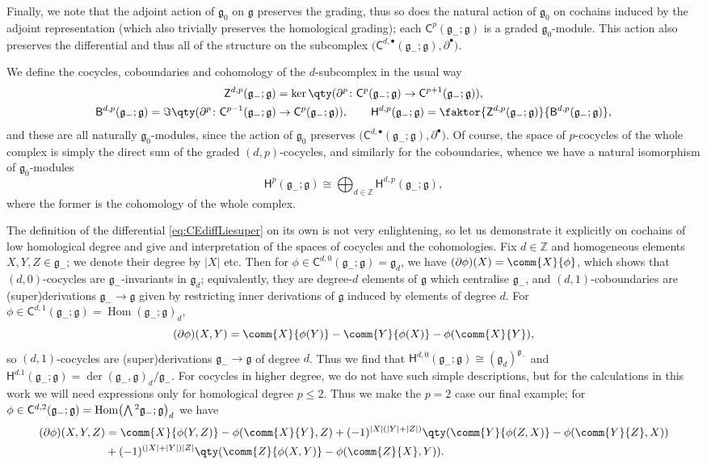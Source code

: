 \documentclass[10pt,a4paper]{amsart}
\numberwithin{equation}{section}
\newcommand{\fg}{\mathfrak{g}}
\newcommand{\ZZ}{\mathbb{Z}}
\newcommand{\ssB}{\mathsf{B}}
\newcommand{\ssC}{\mathsf{C}}
\newcommand{\ssH}{\mathsf{H}}
\newcommand{\ssZ}{\mathsf{Z}}
\newcommand{\Wedge}{\mathchoice{{\textstyle\bigwedge}}{\bigwedge}{\bigwedge}{\bigwedge}}	%
\newcommand{\1}{\mathbbm{1}}
\DeclareMathOperator{\Hom}{Hom}
\begin{document}
Finally, we note that the adjoint action of $\fg_0$ on $\fg$ preserves the grading, thus so does the natural action of $\fg_0$ on cochains induced by the adjoint representation (which also trivially preserves the homological grading); each $\ssC^p(\fg_-;\fg)$ is a graded $\fg_0$-module. This action also preserves the differential and thus all of the structure on the subcomplex $\bigl(\ssC^{d,\bullet}(\fg_-;\fg),\partial^\bullet\bigr)$.


We define the cocycles, coboundaries and cohomology of the $d$-subcomplex in the usual way
\begin{gather*}
	\ssZ^{d,p}(\fg_-;\fg) = \ker\qty(\partial^p\colon \ssC^p(\fg_-;\fg)\to \ssC^{p+1}(\fg_-;\fg)),	\\
	\ssB^{d,p}(\fg_-;\fg) = \Im\qty(\partial^p\colon \ssC^{p-1}(\fg_-;\fg)\to \ssC^{p}(\fg_-;\fg)),	\qquad
	\ssH^{d,p}(\fg_-;\fg) = \faktor{\ssZ^{d,p}(\fg_-;\fg)}{\ssB^{d,p}(\fg_-;\fg)},
\end{gather*}
and these are all naturally $\fg_0$-modules, since the action of $\fg_0$ preserves $\bigl(\ssC^{d,\bullet}(\fg_-;\fg),\partial^\bullet\bigr)$. Of course, the space of $p$-cocycles of the whole complex is simply the direct sum of the graded $(d,p)$-cocycles, and similarly for the coboundaries, whence we have a natural isomorphism of $\fg_0$-modules
\[
	\ssH^p(\fg_-;\fg) \cong \bigoplus_{d\in\ZZ}\ssH^{d,p}(\fg_-;\fg),
\]
where the former is the cohomology of the whole complex.

The definition of the differential \eqref{eq:CEdiffLiesuper} on its own is not very enlightening, so let us demonstrate it explicitly on cochains of low homological degree and give and interpretation of the spaces of cocycles and the cohomologies. Fix $d\in\ZZ$ and homogeneous elements $X,Y,Z\in\fg_-$; we denote their degree by $|X|$ etc. Then for $\phi\in\ssC^{d,0}(\fg_-;\fg)=\fg_d$, we have
$(\partial \phi)(X) = \comm{X}{\phi}$,
which shows that $(d,0)$-cocycles are $\fg_-$-invariants in $\fg_d$; equivalently, they are degree-$d$ elements of $\fg$ which centralise $\fg_-$, and $(d,1)$-coboundaries are (super)derivations $\fg_-\to\fg$ given by restricting inner derivations of $\fg$ induced by elements of degree $d$. For $\phi\in\ssC^{d,1}(\fg_-;\fg)=\Hom(\fg_-;\fg)_d$,
\[
	(\partial \phi)(X,Y) = \comm{X}{\phi(Y)} - \comm{Y}{\phi(X)} -\phi(\comm{X}{Y}),
\]
so $(d,1)$-cocycles are (super)derivations $\fg_-\to\fg$ of degree $d$. Thus we find that $\ssH^{d,0}(\fg_-;\fg) \cong (\fg_d)^{\fg_-}$ and $\ssH^{d.1}(\fg_-;\fg)=\operatorname{der}(\fg_-,\fg)_d/\fg_-$. For cocycles in higher degree, we do not have such simple descriptions, but for the calculations in this work we will need expressions only for homological degree $p\leq 2$. Thus we make the $p=2$ case our final example; for $\phi\in\ssC^{d,2}(\fg_-;\fg)=\Hom\bigl(\Wedge^2\fg_-;\fg\bigr)_d$ we have
\begin{align*}
	(\partial \phi)(X,Y,Z) &= \comm{X}{\phi(Y,Z)} - \phi(\comm{X}{Y},Z) + (-1)^{|X|(|Y|+|Z|)} \qty( \comm{Y}{\phi(Z,X)} - \phi(\comm{Y}{Z},X) )\\
		& + (-1)^{(|X|+|Y|)|Z|} \qty( \comm{Z}{\phi(X,Y)} - \phi(\comm{Z}{X},Y) ).
\end{align*}
\end{document}
